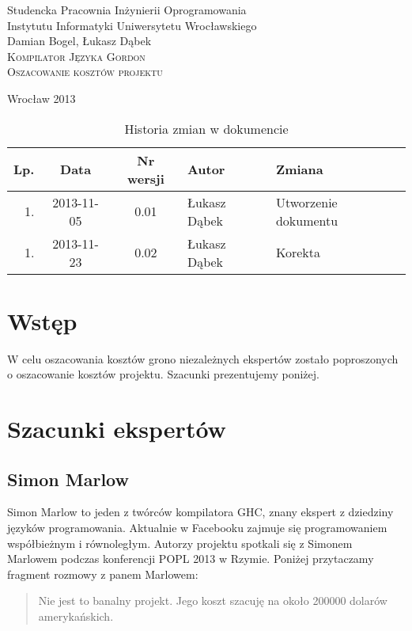 \documentclass{documentation}
\begin{document}
\begin{titlepage}
\begin{center}
Studencka Pracownia Inżynierii Oprogramowania\\
Instytutu Informatyki Uniwersytetu Wrocławskiego\\[6cm]

Damian Bogel, Łukasz Dąbek\\[1cm]
\textsc{\LARGE Kompilator Języka Gordon}\\[0.5cm]
\textsc{\large Oszacowanie kosztów projektu}

\vfill
Wrocław 2013 \\[2.5cm]

\end{center}
\end{titlepage}

\newpage
\begin{table}
	\centering
    \captionsetup{name=Tabela}
	\caption{Historia zmian w dokumencie}
		\begin{tabular}{|r|c|c|l|l|}
		\hline
		Lp.  & Data       & Nr wersji & Autor                 & Zmiana \\ \hline
		1.   & 2013-11-05 & 0.01 & Łukasz Dąbek & Utworzenie dokumentu \\ \hline
		1.   & 2013-11-23 & 0.02 & Łukasz Dąbek & Korekta             \\ \hline
	\end{tabular}
\end{table}
\newpage

\tableofcontents
\setcounter{page}{2}

\newpage

\section{Wstęp}
\noindent W celu oszacowania kosztów grono niezależnych ekspertów zostało poproszonych
o oszacowanie kosztów projektu. Szacunki prezentujemy poniżej.

\section{Szacunki ekspertów}
\subsection{Simon Marlow}
\noindent Simon Marlow to jeden z twórców kompilatora \textsc{GHC}, znany ekspert
z dziedziny języków programowania. Aktualnie w Facebooku zajmuje się programowaniem
współbieżnym i równoległym. Autorzy projektu spotkali się z Simonem Marlowem podczas
konferencji POPL 2013 w Rzymie. Poniżej przytaczamy fragment rozmowy z panem Marlowem:
\begin{quotation}
    Nie jest to banalny projekt. Jego koszt szacuję na około 200000 dolarów amerykańskich.
\end{quotation}
\end{document}

